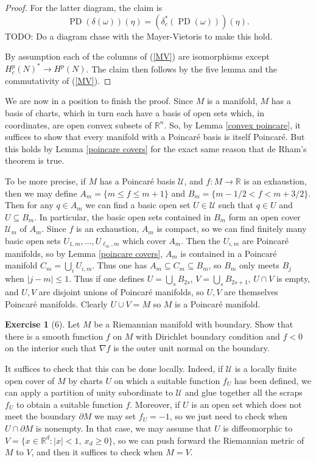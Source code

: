 \documentclass[10pt]{article}
\newcommand{\RR}{\mathbb{R}}
\DeclareMathOperator{\PD}{PD}
\theoremstyle{definition}
\newtheorem{exer}{Exercise}
\begin{document}
\begin{proof}
For the latter diagram, the claim is
\begin{equation}
\label{diagram 2}
\PD(\delta(\omega))(\eta) = (\delta_c^*(\PD(\omega)))(\eta).
\end{equation}
TODO: Do a diagram chase with the Mayer-Vietoris to make this hold.

By assumption each of the columns of (\ref{MV}) are isomorphisms except $H^p_c(N)^* \to H^p(N)$.
The claim then follows by the five lemma and the commutativity of (\ref{MV}).
\end{proof}

We are now in a position to finish the proof.
Since $M$ is a manifold, $M$ has a basis of charts, which in turn each have a basis of open sets which, in coordinates, are open convex subsets of $\RR^n$.
So, by Lemma \ref{convex poincare}, it suffices to show that every manifold with a Poincar\'e basis is itself Poincar\'e.
But this holds by Lemma \ref{poincare covers} for the exact same reason that de Rham's theorem is true.

To be more precise, if $M$ has a Poincar\'e basis $\mathcal U$, and $f: M \to \RR$ is an exhaustion, then we may define $A_m = \{m \leq f \leq m + 1\}$ and $B_m = \{m - 1/2 < f < m + 3/2\}$.
Then for any $q \in A_m$ we can find a basic open set $U \in \mathcal U$ such that $q \in U$ and $U \subseteq B_m$.
In particular, the basic open sets contained in $B_m$ form an open cover $\mathcal U_m$ of $A_m$.
Since $f$ is an exhaustion, $A_m$ is compact, so we can find finitely many basic open sets $U_{1,m}, \dots, U_{\ell_m,m}$ which cover $A_m$.
Then the $U_{i,m}$ are Poincar\'e manifolds, so by Lemma \ref{poincare covers}, $A_m$ is contained in a Poincar\'e manifold $C_m = \bigcup_i U_{i,m}$.
Thus one has $A_m \subseteq C_m \subseteq B_m$, so $B_m$ only meets $B_j$ when $|j - m| \leq 1$.
Thus if one defines $U = \bigcup_s B_{2s}$, $V = \bigcup_s B_{2s + 1}$, $U \cap V$ is empty, and $U,V$ are disjoint unions of Poincar\'e manifolds, so $U,V$ are themselves Poincar\'e manifolds. Clearly $U \cup V = M$ so $M$ is a Poincar\'e manifold.


\begin{exer}[6]
Let $M$ be a Riemannian manifold with boundary.
Show that there is a smooth function $f$ on $M$ with Dirichlet boundary condition and $f < 0$ on the interior such that $\nabla f$ is the outer unit normal on the boundary.
\end{exer}

It suffices to check that this can be done locally. Indeed, if $\mathcal U$ is a locally finite open cover of $M$ by charts $U$ on which a suitable function $f_U$ has been defined, we can apply a partition of unity subordinate to $\mathcal U$ and glue together all the scraps $f_U$ to obtain a suitable function $f$.
Moreover, if $U$ is an open set which does not meet the boundary $\partial M$ we may set $f_U = -1$, so we just need to check when $U \cap \partial M$ is nonempty. In that case, we may assume that $U$ is diffeomorphic to $V = \{x \in \RR^d: |x| < 1,~x_d \geq 0\}$, so we can push forward the Riemannian metric of $M$ to $V$, and then it suffices to check when $M = V$.
\end{document}
